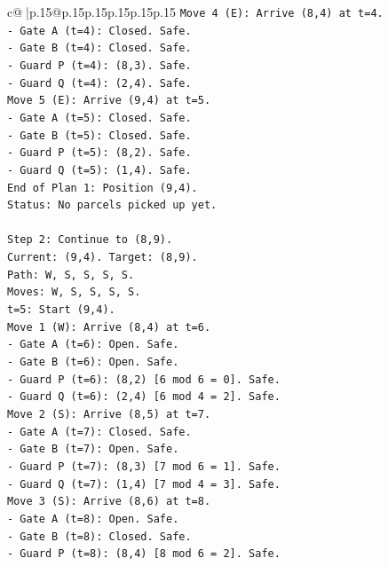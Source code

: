 \documentclass{article}
\begin{document}
{\begin{supertabular}{c@{$\;$}|p{.15\linewidth}@{}p{.15\linewidth}p{.15\linewidth}p{.15\linewidth}p{.15\linewidth}p{.15\linewidth}}
{{{\texttt{Move 4 (E): Arrive (8,4) at t=4.} \\
\texttt{{-} Gate A (t=4): Closed. Safe.} \\
\texttt{{-} Gate B (t=4): Closed. Safe.} \\
\texttt{{-} Guard P (t=4): (8,3). Safe.} \\
\texttt{{-} Guard Q (t=4): (2,4). Safe.} \\
\texttt{Move 5 (E): Arrive (9,4) at t=5.} \\
\texttt{{-} Gate A (t=5): Closed. Safe.} \\
\texttt{{-} Gate B (t=5): Closed. Safe.} \\
\texttt{{-} Guard P (t=5): (8,2). Safe.} \\
\texttt{{-} Guard Q (t=5): (1,4). Safe.} \\
\texttt{End of Plan 1: Position (9,4).} \\
\texttt{Status: No parcels picked up yet.} \\
\\ 
\texttt{Step 2: Continue to (8,9).} \\
\texttt{Current: (9,4). Target: (8,9).} \\
\texttt{Path: W, S, S, S, S.} \\
\texttt{Moves: W, S, S, S, S.} \\
\texttt{t=5: Start (9,4).} \\
\texttt{Move 1 (W): Arrive (8,4) at t=6.} \\
\texttt{{-} Gate A (t=6): Open. Safe.} \\
\texttt{{-} Gate B (t=6): Open. Safe.} \\
\texttt{{-} Guard P (t=6): (8,2) {[}6 mod 6 = 0{]}. Safe.} \\
\texttt{{-} Guard Q (t=6): (2,4) {[}6 mod 4 = 2{]}. Safe.} \\
\texttt{Move 2 (S): Arrive (8,5) at t=7.} \\
\texttt{{-} Gate A (t=7): Closed. Safe.} \\
\texttt{{-} Gate B (t=7): Open. Safe.} \\
\texttt{{-} Guard P (t=7): (8,3) {[}7 mod 6 = 1{]}. Safe.} \\
\texttt{{-} Guard Q (t=7): (1,4) {[}7 mod 4 = 3{]}. Safe.} \\
\texttt{Move 3 (S): Arrive (8,6) at t=8.} \\
\texttt{{-} Gate A (t=8): Open. Safe.} \\
\texttt{{-} Gate B (t=8): Closed. Safe.} \\
\texttt{{-} Guard P (t=8): (8,4) {[}8 mod 6 = 2{]}. Safe.} \\
}}}
\end{supertabular}}
\end{document}
